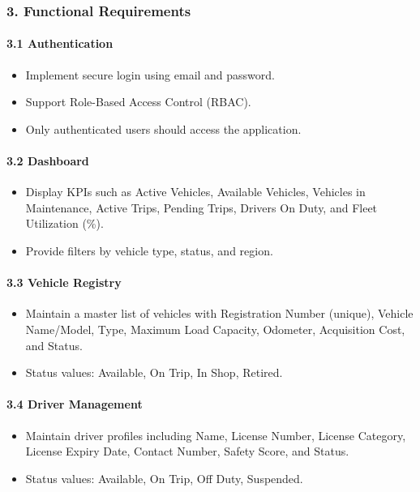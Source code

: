 \documentclass{article}
\begin{document}
\newpage

\subsubsection*{3. Functional Requirements}

\paragraph*{3.1 Authentication}
\begin{itemize}
    \item Implement secure login using email and password.
    \item Support Role-Based Access Control (RBAC).
    \item Only authenticated users should access the application.
\end{itemize}

\paragraph*{3.2 Dashboard}
\begin{itemize}
    \item Display KPIs such as Active Vehicles, Available Vehicles, Vehicles in Maintenance, Active Trips, Pending Trips, Drivers On Duty, and Fleet Utilization (\%).
    \item Provide filters by vehicle type, status, and region.
\end{itemize}

\paragraph*{3.3 Vehicle Registry}
\begin{itemize}
    \item Maintain a master list of vehicles with Registration Number (unique), Vehicle Name/Model, Type, Maximum Load Capacity, Odometer, Acquisition Cost, and Status.
    \item Status values: Available, On Trip, In Shop, Retired.
\end{itemize}

\paragraph*{3.4 Driver Management}
\begin{itemize}
    \item Maintain driver profiles including Name, License Number, License Category, License Expiry Date, Contact Number, Safety Score, and Status.
    \item Status values: Available, On Trip, Off Duty, Suspended.
\end{itemize}
\end{document}
